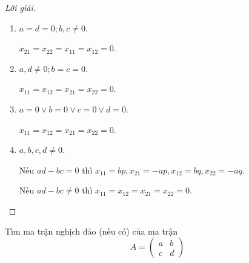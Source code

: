 \documentclass[class=nhvh-linear-algebra,crop=false]{standalone}
\begin{document}
\begin{proof}[Lời giải]
\begin{enumerate}[label = Trường hợp \arabic*:,itemindent=2cm]
        \item $a = d = 0; b, c\ne 0$.
              \par $x_{21} = x_{22} = x_{11} = x_{12} = 0$.
        \item $a, d\ne 0; b = c = 0$.
              \par $x_{11} = x_{12} = x_{21} = x_{22} = 0$.
        \item $a = 0\vee b = 0 \vee c = 0 \vee d = 0$.
              \par $x_{11} = x_{12} = x_{21} = x_{22} = 0$.
        \item $a,b,c,d\ne 0$.
              \par Nếu $ad - bc = 0$ thì $x_{11} = bp, x_{21} = -ap, x_{12} = bq, x_{22} = -aq$.
              \par Nếu $ad - bc \ne 0$ thì $x_{11} = x_{12} = x_{21} = x_{22} = 0$.
    \end{enumerate}
\end{proof}

\begin{exercise}
    Tìm ma trận nghịch đảo (nếu có) của ma trận
    \[
        A =
        \begin{pmatrix}
            a & b \\
            c & d
        \end{pmatrix}
    \]
\end{exercise}
\end{document}

